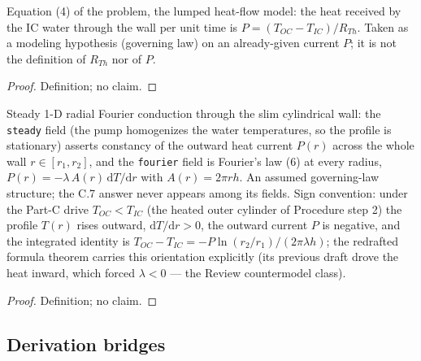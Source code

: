 \begin{definition}
\label{def:IPhO2026Problems_problem_IPhO_2026_4_C_7:LumpedHeatFlowLaw}
Equation (4) of the problem, the lumped heat-flow model: the heat received
by the IC water through the wall per unit time is
$P = (T_{OC} - T_{IC})/R_{Th}$. Taken as a modeling hypothesis (governing
law) on an already-given current $P$; it is not the definition of
$R_{Th}$ nor of $P$.
\end{definition}
\begin{proof}
Definition; no claim.
\end{proof}

\begin{definition}
\label{def:IPhO2026Problems_problem_IPhO_2026_4_C_7:RadialFourierConduction}
Steady 1-D radial Fourier conduction through the slim cylindrical wall:
the \texttt{steady} field (the pump homogenizes the water temperatures, so
the profile is stationary) asserts constancy of the outward heat current
$P(r)$ across the whole wall $r \in [r_1, r_2]$, and the
\texttt{fourier} field is Fourier's law (6) at every radius,
$P(r) = -\lambda\,A(r)\,\mathrm{d}T/\mathrm{d}r$ with
$A(r) = 2\pi r h$. An assumed governing-law structure; the C.7 answer
never appears among its fields.  Sign convention: under the Part-C drive
$T_{OC} < T_{IC}$ (the heated outer cylinder of Procedure step 2) the
profile $T(r)$ rises outward, $\mathrm{d}T/\mathrm{d}r > 0$, the outward
current $P$ is negative, and the integrated identity is
$T_{OC} - T_{IC} = -P\ln(r_2/r_1)/(2\pi\lambda h)$; the redrafted
formula theorem carries this orientation explicitly (its previous draft
drove the heat inward, which forced $\lambda < 0$ --- the Review
countermodel class).
\end{definition}
\begin{proof}
Definition; no claim.
\end{proof}

\subsection*{Derivation bridges}

